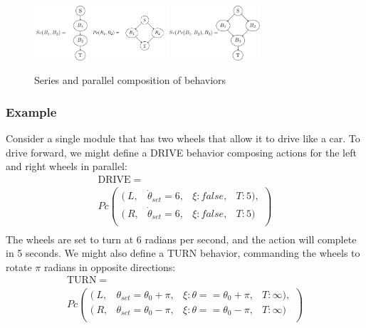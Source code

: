 \documentclass[conference]{IEEEtran}
\theoremstyle{definition}
\begin{document}
\begin{figure}
\begin{center}
\includegraphics[height=0.8in]{images/tikz/series.pdf}
\includegraphics[height=0.8in]{images/tikz/parallel.pdf} \vspace{0.in}
\includegraphics[height=0.8in]{images/tikz/parallel-and-series.pdf}
\end{center}
\caption{Series and parallel composition of behaviors }
\label{fig:graph-composition}
\end{figure}

\subsubsection*{Example}
Consider a single module that has two wheels that allow it to drive like a car. To
drive forward, we might define a DRIVE behavior composing actions for  the left and right wheels
in parallel:\begin{align*}
\mathrm{DRIVE} =~~~~~~~~~~~~~~~~~~~~~~~~~~~~~~~~~~~~~~~~~~~~~~~~~~~ \\
Pc \left( \begin{array}{cccc}
(~L, & \dot\theta_{set}=6, & \xi:false, & T:5), \\
(~R, & \dot\theta_{set}=6, & \xi:false, & T:5) \\
\end{array} \right)\\
\end{align*}
The wheels are set to turn at 6 radians per second, and the action will complete
in 5 seconds.  We might also define a TURN behavior, commanding the wheels to rotate \(\pi\) radians
in opposite directions:
\begin{align*}
\mathrm{TURN} =~~~~~~~~~~~~~~~~~~~~~~~~~~~~~~~~~~~~~~~~~~~~~~~~~~~~~~~~~~~~ \\
Pc \left( \begin{array}{cccc}
(~L, & \theta_{set}=\theta_0+\pi, & \xi:\theta==\theta_0+\pi, & T:\infty), \\
(~R, & \theta_{set}=\theta_0-\pi, & \xi:\theta==\theta_0-\pi, & T:\infty) \\
\end{array} \right)\\
\end{align*}
\end{document}
